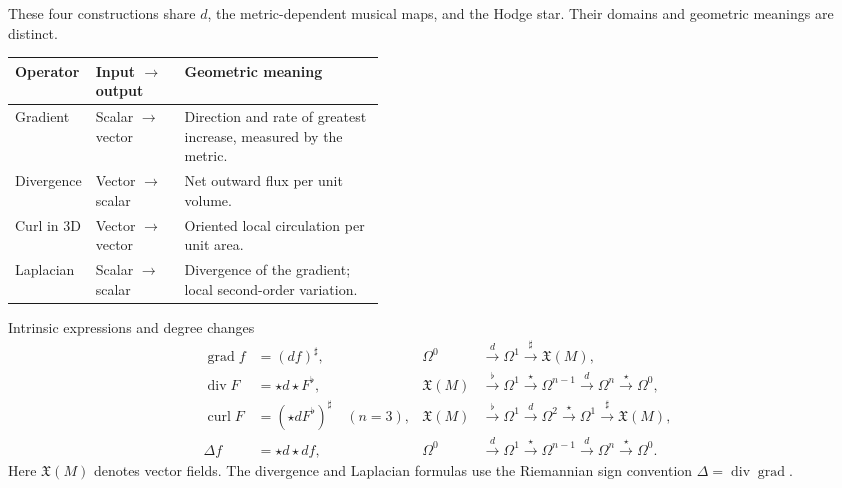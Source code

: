 \documentclass[11pt,letterpaper]{article}
\newcommand{\manualsection}[1]{%
  \Needspace{13\baselineskip}%
  \vspace{0.35cm}\par\noindent{\Large\bfseries\color{blackmain} #1}\par\nobreak
  \noindent{\color{orangeacc}\rule{\linewidth}{1.4pt}}\par\nobreak\vspace{0.15cm}}
\begin{document}
\manualsection{13. Operator map}
These four constructions share $d$, the metric-dependent musical maps, and the Hodge star. Their domains and geometric meanings are distinct.
\begin{center}
\renewcommand{\arraystretch}{1.24}
\small
\begin{tabularx}{\linewidth}{@{}p{0.19\linewidth}p{0.24\linewidth}X@{}}
\toprule
\textbf{Operator} & \textbf{Input $\to$ output} & \textbf{Geometric meaning}\\
\midrule
Gradient & Scalar $\to$ vector & Direction and rate of greatest increase, measured by the metric.\\
Divergence & Vector $\to$ scalar & Net outward flux per unit volume.\\
Curl in 3D & Vector $\to$ vector & Oriented local circulation per unit area.\\
Laplacian & Scalar $\to$ scalar & Divergence of the gradient; local second-order variation.\\
\bottomrule
\end{tabularx}
\end{center}
\begin{infobox}[orangeacc]{Intrinsic expressions and degree changes}
\begin{align*}
\operatorname{grad}f&=(df)^\sharp,
&\Omega^0&\xrightarrow{d}\Omega^1\xrightarrow{\sharp}\mathfrak X(M),\\
\operatorname{div}F&=\star d\star F^\flat,
&\mathfrak X(M)&\xrightarrow{\flat}\Omega^1\xrightarrow{\star}\Omega^{n-1}
  \xrightarrow{d}\Omega^n\xrightarrow{\star}\Omega^0,\\
\operatorname{curl}F&=(\star dF^\flat)^\sharp\quad(n=3),
&\mathfrak X(M)&\xrightarrow{\flat}\Omega^1\xrightarrow{d}\Omega^2
  \xrightarrow{\star}\Omega^1\xrightarrow{\sharp}\mathfrak X(M),\\
\Delta f&=\star d\star df,
&\Omega^0&\xrightarrow{d}\Omega^1\xrightarrow{\star}\Omega^{n-1}
  \xrightarrow{d}\Omega^n\xrightarrow{\star}\Omega^0.
\end{align*}
Here $\mathfrak X(M)$ denotes vector fields. The divergence and Laplacian formulas use the Riemannian sign convention $\Delta=\operatorname{div}\operatorname{grad}$.
\end{infobox}
\end{document}
